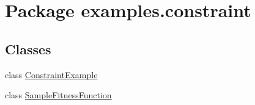 \hypertarget{namespaceexamples_1_1constraint}{\section{Package examples.\-constraint}
\label{namespaceexamples_1_1constraint}
}
\subsection*{Classes}
\begin{DoxyCompactItemize}
\item 
class \hyperlink{classexamples_1_1constraint_1_1_constraint_example}{Constraint\-Example}
\item 
class \hyperlink{classexamples_1_1constraint_1_1_sample_fitness_function}{Sample\-Fitness\-Function}
\end{DoxyCompactItemize}

